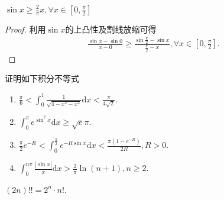 \documentclass[../../main.tex]{subfiles}%
\begin{document}
\begin{theorem}[Jordan不等式]\label{theorem:Jordan不等式}
$\sin x\geqslant \frac{2}{\pi}x,\forall x\in [0,\frac{\pi}{2}]$
\end{theorem}
\begin{proof}
利用$\sin x$的上凸性及割线放缩可得
\begin{align*}
\frac{\sin x-\sin 0}{x-0}\geqslant \frac{\sin \frac{\pi}{2}-\sin x}{\frac{\pi}{2}-x},\forall x\in \left[ 0,\frac{\pi}{2} \right] .
\end{align*}
\end{proof}

\begin{example}
证明如下积分不等式
\begin{enumerate}
\item \(\frac{\pi}{6} < \int_{0}^{1}\frac{1}{\sqrt{4 - x^{2}-x^{3}}}\mathrm{d}x < \frac{\pi}{4\sqrt{2}}\).

\item \(\int_{0}^{\pi}e^{\sin^{2}x}\mathrm{d}x \geqslant \sqrt{e}\pi\).

\item \(\frac{\pi}{2}e^{-R} < \int_{0}^{\frac{\pi}{2}}e^{-R\sin x}\mathrm{d}x < \frac{\pi(1 - e^{-R})}{2R}, R > 0\).

\item $\int_0^{n\pi}{\frac{\left| \sin x \right|}{x}\mathrm{d}x}>\frac{2}{\pi}\ln \left( n+1 \right) ,n\geqslant 2.$
\end{enumerate}
\end{example}
\begin{remark}
$(2n)!!=2^n\cdot n!.$
\end{remark}
\end{document}

